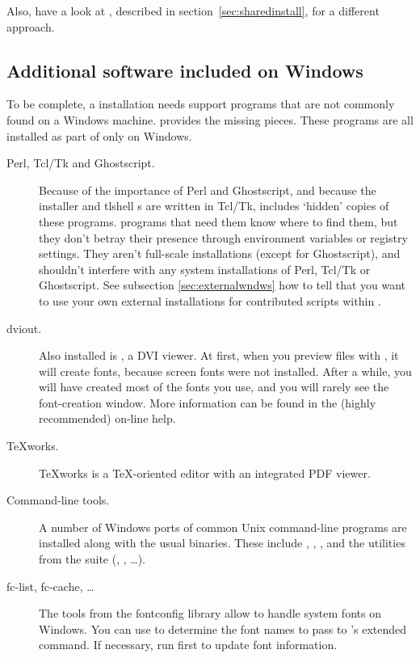 \documentclass{article}
\begin{document}
Also, have a look at , described in
section~\ref{sec:sharedinstall}, for a different approach.

\subsection{Additional software included on Windows}

To be complete, a \TL{} installation needs support programs that are not
commonly found on a Windows machine. \TL{} provides the missing pieces.
These programs are all installed as part of \TL{} only on Windows.

\begin{description}
\item[Perl, Tcl/Tk and Ghostscript.] Because of the importance of Perl and
  Ghostscript, and because the installer and tlshell \GUI{}s are written
  in Tcl/Tk, \TL{} includes `hidden' copies of these programs. \TL{}
  programs that need them know where to find them, but they don't betray
  their presence through environment variables or registry settings.
  They aren't full-scale installations (except for Ghostscript), and
  shouldn't interfere with any system installations of Perl, Tcl/Tk or
  Ghostscript. See subsection \ref{sec:externalwndws} how to tell \TL{} that
  you want to use your own external installations for contributed
  scripts within \TL.

\item[dviout.] Also installed is , a DVI viewer.
  At first, when you preview files with , it will create
  fonts, because screen fonts were not installed. After a while, you
  will have created most of the fonts you use, and you will rarely see
  the font-creation window.  More information can be found in the
  (highly recommended) on-line help.

\item[\TeX{}works.]  \TeX{}works is a \TeX-oriented editor with
  an integrated PDF viewer.

\item[Command-line tools.] A number of Windows ports of common Unix
  command-line programs are installed along with the usual \TL{}
  binaries. These include , ,
  , and the utilities from the  suite
  (, , \ldots).

\item[fc-list, fc-cache, \ldots] The tools from the fontconfig library allow
  \XeTeX{} to handle system fonts on Windows.  You can use
   to determine the font names to pass to \XeTeX's
  extended  command. If necessary, run 
  first to update font information.

\end{description}
\end{document}
